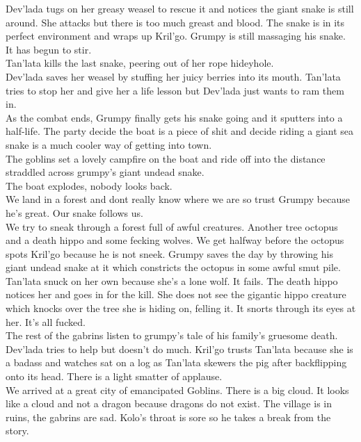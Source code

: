 Dev’lada tugs on her greasy weasel to rescue it and notices the giant snake is still around. She attacks but there is too much greast and blood. The snake is in its perfect environment and wraps up Kril’go. Grumpy is still massaging his snake. It has begun to stir.\\
Tan’lata kills the last snake, peering out of her rope hideyhole.\\
Dev’lada saves her weasel by stuffing her juicy berries into its mouth. Tan’lata tries to stop her and give her a life lesson but Dev’lada just wants to ram them in.\\
As the combat ends, Grumpy finally gets his snake going and it sputters into a half-life. The party decide the boat is a piece of shit and decide riding a giant sea snake is a much cooler way of getting into town.\\
The goblins set a lovely campfire on the boat and ride off into the distance straddled across grumpy’s giant undead snake.\\
The boat explodes, nobody looks back.\\
We land in a forest and dont really know where we are so trust Grumpy because he’s great. Our snake follows us.\\
We try to sneak through a forest full of awful creatures. Another tree octopus and a death hippo and some fecking wolves. We get halfway before the octopus spots Kril’go because he is not sneek. Grumpy saves the day by throwing his giant undead snake at it which constricts the octopus in some awful smut pile.\\
Tan’lata snuck on her own because she’s a lone wolf. It fails. The death hippo notices her and goes in for the kill. She does not see the gigantic hippo creature which knocks over the tree she is hiding on, felling it. It snorts through its eyes at her. It’s all fucked.\\
The rest of the gabrins listen to grumpy’s tale of his family’s gruesome death.\\
Dev’lada tries to help but doesn’t do much. Kril’go trusts Tan’lata because she is a badass and watches sat on a log as Tan’lata skewers the pig after backflipping onto its head. There is a light smatter of applause.\\
We arrived at a great city of emancipated Goblins. There is a big cloud. It looks like a cloud and not a dragon because dragons do not exist. The village is in ruins, the gabrins are sad. Kolo’s throat is sore so he takes a break from the story.
